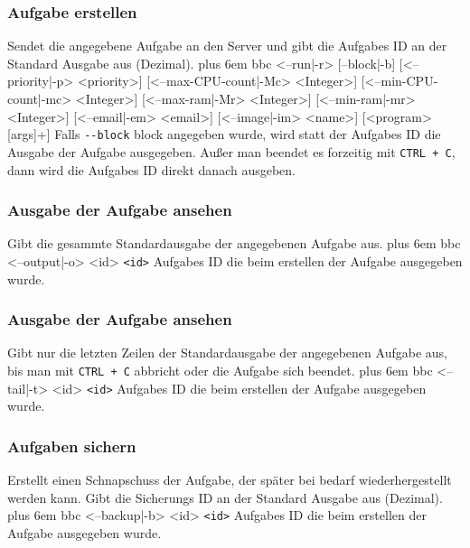 \documentclass[a4paper,12pt]{article}
\makeatletter
\newenvironment{mycode}
 {\def\@xobeysp{\ }\verbatim\rightskip=0pt plus 6em\relax}
 {\endverbatim}
\makeatother
\begin{document}
\subsubsection{Aufgabe erstellen}
Sendet die angegebene \gls{Aufgabe} an den \gls{Server} und gibt die \glspl{Aufgabe} ID an der Standard Ausgabe aus (Dezimal).
\begin{mycode}
bbc <--run|-r> [--block|-b] [<--priority|-p> <priority>] [<--max-\gls{CPU}-count|-Mc> <Integer>] [<--min-\gls{CPU}-count|-mc> <Integer>] [<--max-ram|-Mr> <Integer>] [<--min-ram|-mr> <Integer>] [<--email|-em> <email>] [<--image|-im> <name>] [<program> [args]+]
\end{mycode}
Falls \texttt{-{}-block} block angegeben wurde, wird statt der \glspl{Aufgabe} ID die Ausgabe der \gls{Aufgabe} ausgegeben.
Außer man beendet es forzeitig mit \texttt{CTRL + C}, dann wird die \glspl{Aufgabe} ID direkt danach ausgeben.

\subsubsection{Ausgabe der \gls{Aufgabe} ansehen}
Gibt die gesammte Standardausgabe der angegebenen \gls{Aufgabe} aus.
\begin{mycode}
bbc <--output|-o> <id>
\end{mycode}
\texttt{<id>} \glspl{Aufgabe} ID die beim erstellen der \gls{Aufgabe} ausgegeben wurde.

\subsubsection{Ausgabe der \gls{Aufgabe} ansehen}
Gibt nur die letzten Zeilen der Standardausgabe der angegebenen \gls{Aufgabe} aus, bis man mit \texttt{CTRL + C} abbricht oder die \gls{Aufgabe} sich beendet.
\begin{mycode}
bbc <--tail|-t> <id>
\end{mycode}
\texttt{<id>} \glspl{Aufgabe} ID die beim erstellen der \gls{Aufgabe} ausgegeben wurde.

\subsubsection{Aufgaben sichern}
Erstellt einen Schnapschuss der \gls{Aufgabe}, der später bei bedarf wiederhergestellt werden kann.
Gibt die Sicherungs ID an der Standard Ausgabe aus (Dezimal).
\begin{mycode}
bbc <--backup|-b> <id>
\end{mycode}
\texttt{<id>} \glspl{Aufgabe} ID die beim erstellen der \gls{Aufgabe} ausgegeben wurde.
\end{document}
